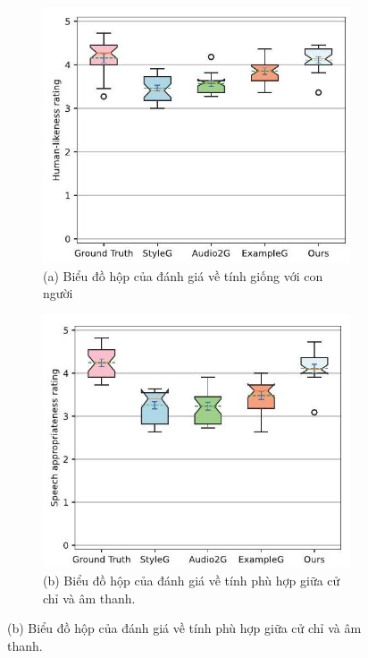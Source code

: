 \begin{figure}[htbp]
    \centering
    \begin{subfigure}[b]{0.3\textwidth}
         \includegraphics[width=\textwidth]{images/humanlike_score.jpg}
        \caption*{(a) Biểu đồ hộp của đánh giá về tính giống với con người}
    \end{subfigure}
    \hfill
    \begin{subfigure}[b]{0.3\textwidth}
        \includegraphics[width=\textwidth]{images/speech_score.jpg}
         \caption*{(b) Biểu đồ hộp của đánh giá về tính phù hợp giữa cử chỉ và âm thanh.}

\end{subfigure}
\end{figure}

